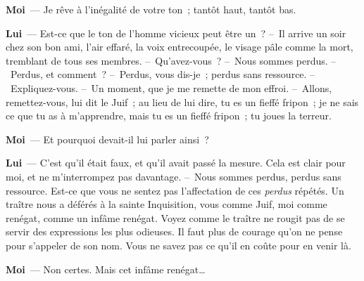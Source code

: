 \documentclass[french,twoside]{book} %
\newcommand{\labelchar}[1]{\textbf{\color{rubric} #1}}
\begin{document}
\labelchar{Moi} — Je rêve à l’inégalité de votre ton ; tantôt haut, tantôt bas.\par
\labelchar{Lui} — Est-ce que le ton de l’homme vicieux peut être un ? – Il arrive un soir chez son bon ami, l’air effaré, la voix entrecoupée, le visage pâle comme la mort, tremblant de tous ses membres. – Qu’avez-vous ? – Nous sommes perdus. – Perdus, et comment ? – Perdus, vous dis-je ; perdus sans ressource. – Expliquez-vous. – Un moment, que je me remette de mon effroi. – Allons, remettez-vous, lui dit le Juif ; au lieu de lui dire, tu es un fieffé fripon ; je ne sais ce que tu as à m’apprendre, mais tu es un fieffé fripon ; tu joues la terreur.\par
\labelchar{Moi} — Et pourquoi devait-il lui parler ainsi ?\par
\labelchar{Lui} — C’est qu’il était faux, et qu’il avait passé la mesure. Cela est clair pour moi, et ne m’interrompez pas davantage. – Nous sommes perdus, perdus sans ressource. Est-ce que vous ne sentez pas l’affectation de ces\emph{ perdus} répétés. Un traître nous a déférés à la sainte Inquisition, vous comme Juif, moi comme renégat, comme un infâme renégat. Voyez comme le traître ne rougit pas de se servir des expressions les plus odieuses. Il faut plus de courage qu’on ne pense pour s’appeler de son nom. Vous ne savez pas ce qu’il en coûte pour en venir là.\par
\labelchar{Moi} — Non certes. Mais cet infâme renégat…\par
\end{document}
